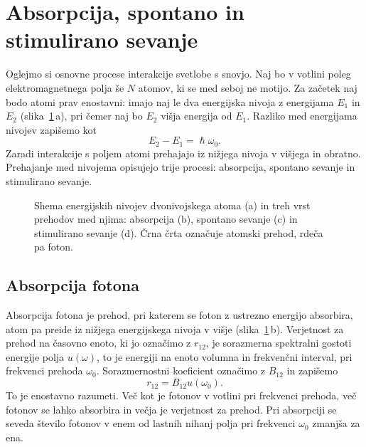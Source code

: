 \section{Absorpcija, spontano in stimulirano sevanje}
\label{chap:ASSS}
Oglejmo si osnovne procese interakcije svetlobe s snovjo. Naj
bo v votlini poleg elektro\-mag\-net\-nega polja še $N$ atomov, ki se med
seboj ne motijo. Za začetek naj bodo atomi prav enostavni:
imajo naj le dva energijska nivoja z energijama $E_{1}$ in $E_{2}$ (slika~\ref{sl4.1}\,a),
pri čemer naj bo $E_2$ višja energija od $E_1$. Razliko med energijama nivojev zapišemo kot 
\begin{equation}
 E_2 - E_1 = \hslash \omega_0.
\end{equation}
Zaradi interakcije s poljem
atomi prehajajo iz nižjega nivoja v višjega in obratno. Prehajanje 
med nivojema opisujejo trije procesi: 
absorpcija, spontano sevanje in stimulirano sevanje.

\begin{figure}[h]
\centering
\def\svgwidth{145truemm} 

\caption{Shema energijskih nivojev dvonivojskega atoma (a) in treh vrst prehodov med njima:
absorpcija (b), spontano sevanje (c) in stimulirano sevanje (d). Črna črta označuje atomski
prehod, rdeča pa foton.}
\label{sl4.1}
\end{figure}

\subsection*{Absorpcija fotona}
Absorpcija fotona je prehod, pri katerem se foton 
z ustrezno energijo absorbira, atom pa preide iz nižjega energijskega nivoja 
v višje (slika~\ref{sl4.1}\,b). 
Verjetnost za prehod na časovno enoto, ki jo označimo z $r_{12}$, 
je sorazmerna spektralni gostoti energije polja $u(\omega)$, 
to je energiji na enoto volumna in frekvenčni interval, pri frekvenci prehoda $\omega_{0}$.
Sorazmernostni koeficient označimo z $B_{12}$ in 
zapišemo
\begin{equation}
r_{12}=B_{12}u(\omega_{0}).
\label{4.16}
\end{equation}
To je enostavno razumeti. Več kot je fotonov v votlini pri frekvenci prehoda, 
več fotonov se lahko absorbira in večja je verjetnost za prehod. Pri absorpciji se
seveda število fotonov v enem od lastnih nihanj polja pri frekvenci
$\omega_{0}$ zmanjša za ena.

